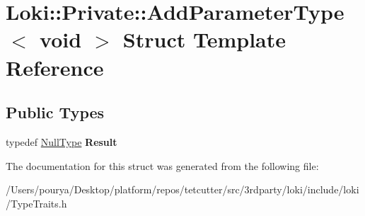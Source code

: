 \hypertarget{structLoki_1_1Private_1_1AddParameterType_3_01void_01_4}{}\section{Loki\+:\+:Private\+:\+:Add\+Parameter\+Type$<$ void $>$ Struct Template Reference}
\label{structLoki_1_1Private_1_1AddParameterType_3_01void_01_4}
\subsection*{Public Types}
\begin{DoxyCompactItemize}
\item 
\hypertarget{structLoki_1_1Private_1_1AddParameterType_3_01void_01_4_a2dfe0685e954ae54fe13dc3b51e80706}{}typedef \hyperlink{classLoki_1_1NullType}{Null\+Type} {\bfseries Result}\label{structLoki_1_1Private_1_1AddParameterType_3_01void_01_4_a2dfe0685e954ae54fe13dc3b51e80706}

\end{DoxyCompactItemize}


The documentation for this struct was generated from the following file\+:\begin{DoxyCompactItemize}
\item 
/\+Users/pourya/\+Desktop/platform/repos/tetcutter/src/3rdparty/loki/include/loki/Type\+Traits.\+h\end{DoxyCompactItemize}
